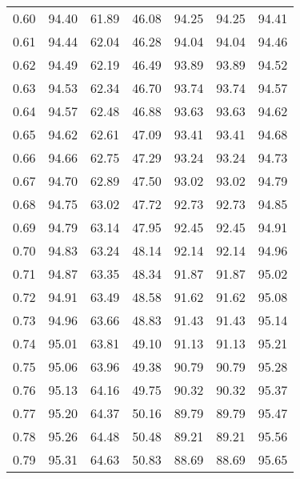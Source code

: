 \begin{tabular}{|c|c|c|c|c|c|c|}
      0.60 &     94.40 &     61.89 &      46.08 &   94.25 &      94.25 &         94.41 \\
      0.61 &     94.44 &     62.04 &      46.28 &   94.04 &      94.04 &         94.46 \\
      0.62 &     94.49 &     62.19 &      46.49 &   93.89 &      93.89 &         94.52 \\
      0.63 &     94.53 &     62.34 &      46.70 &   93.74 &      93.74 &         94.57 \\
      0.64 &     94.57 &     62.48 &      46.88 &   93.63 &      93.63 &         94.62 \\
      0.65 &     94.62 &     62.61 &      47.09 &   93.41 &      93.41 &         94.68 \\
      0.66 &     94.66 &     62.75 &      47.29 &   93.24 &      93.24 &         94.73 \\
      0.67 &     94.70 &     62.89 &      47.50 &   93.02 &      93.02 &         94.79 \\
      0.68 &     94.75 &     63.02 &      47.72 &   92.73 &      92.73 &         94.85 \\
      0.69 &     94.79 &     63.14 &      47.95 &   92.45 &      92.45 &         94.91 \\
      0.70 &     94.83 &     63.24 &      48.14 &   92.14 &      92.14 &         94.96 \\
      0.71 &     94.87 &     63.35 &      48.34 &   91.87 &      91.87 &         95.02 \\
      0.72 &     94.91 &     63.49 &      48.58 &   91.62 &      91.62 &         95.08 \\
      0.73 &     94.96 &     63.66 &      48.83 &   91.43 &      91.43 &         95.14 \\
      0.74 &     95.01 &     63.81 &      49.10 &   91.13 &      91.13 &         95.21 \\
      0.75 &     95.06 &     63.96 &      49.38 &   90.79 &      90.79 &         95.28 \\
      0.76 &     95.13 &     64.16 &      49.75 &   90.32 &      90.32 &         95.37 \\
      0.77 &     95.20 &     64.37 &      50.16 &   89.79 &      89.79 &         95.47 \\
      0.78 &     95.26 &     64.48 &      50.48 &   89.21 &      89.21 &         95.56 \\
      0.79 &     95.31 &     64.63 &      50.83 &   88.69 &      88.69 &         95.65 \\

\end{tabular}
